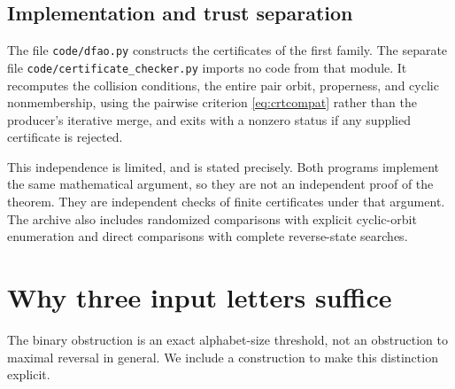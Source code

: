 \documentclass[11pt,a4paper]{article}
\numberwithin{equation}{section}
\theoremstyle{definition}
\theoremstyle{remark}
\begin{document}
\subsection{Implementation and trust separation}\label{sec:trust}

The file \texttt{code/dfao.py} constructs the certificates of the first
family. The separate file
\texttt{code/\allowbreak certificate\_\allowbreak checker.py} imports no
code from that module. It recomputes the collision conditions, the entire
pair orbit, properness, and cyclic nonmembership, using the pairwise
criterion \eqref{eq:crtcompat} rather than the producer's iterative merge,
and exits with a nonzero status if any supplied certificate is rejected.

This independence is limited, and is stated precisely. Both programs
implement the same mathematical argument, so they are not an independent
proof of the theorem. They are independent checks of finite certificates
under that argument. The archive also includes randomized comparisons with
explicit cyclic-orbit enumeration and direct comparisons with complete
reverse-state searches.

\section{Why three input letters suffice}\label{sec:ternary}

The binary obstruction is an exact alphabet-size threshold, not an
obstruction to maximal reversal in general. We include a construction to
make this distinction explicit.
\end{document}
